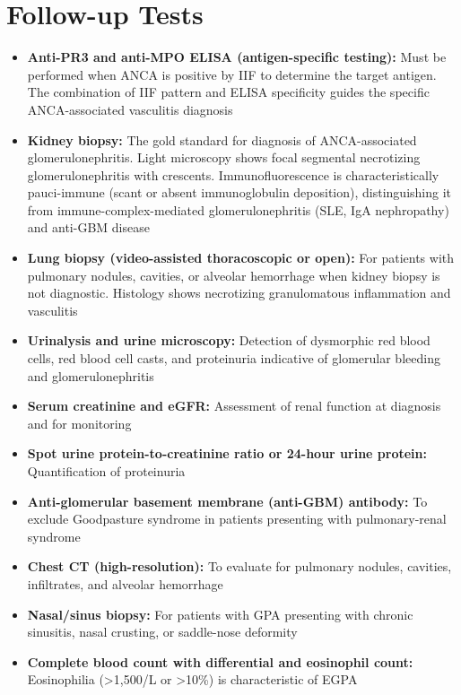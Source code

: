\section*{Follow-up Tests}
\begin{itemize}
  \item \textbf{Anti-PR3 and anti-MPO ELISA (antigen-specific testing):} Must be performed when ANCA is positive by IIF to determine the target antigen. The combination of IIF pattern and ELISA specificity guides the specific ANCA-associated vasculitis diagnosis
  \item \textbf{Kidney biopsy:} The gold standard for diagnosis of ANCA-associated glomerulonephritis. Light microscopy shows focal segmental necrotizing glomerulonephritis with crescents. Immunofluorescence is characteristically pauci-immune (scant or absent immunoglobulin deposition), distinguishing it from immune-complex-mediated glomerulonephritis (SLE, IgA nephropathy) and anti-GBM disease
  \item \textbf{Lung biopsy (video-assisted thoracoscopic or open):} For patients with pulmonary nodules, cavities, or alveolar hemorrhage when kidney biopsy is not diagnostic. Histology shows necrotizing granulomatous inflammation and vasculitis
  \item \textbf{Urinalysis and urine microscopy:} Detection of dysmorphic red blood cells, red blood cell casts, and proteinuria indicative of glomerular bleeding and glomerulonephritis
  \item \textbf{Serum creatinine and eGFR:} Assessment of renal function at diagnosis and for monitoring
  \item \textbf{Spot urine protein-to-creatinine ratio or 24-hour urine protein:} Quantification of proteinuria
  \item \textbf{Anti-glomerular basement membrane (anti-GBM) antibody:} To exclude Goodpasture syndrome in patients presenting with pulmonary-renal syndrome
  \item \textbf{Chest CT (high-resolution):} To evaluate for pulmonary nodules, cavities, infiltrates, and alveolar hemorrhage
  \item \textbf{Nasal/sinus biopsy:} For patients with GPA presenting with chronic sinusitis, nasal crusting, or saddle-nose deformity
  \item \textbf{Complete blood count with differential and eosinophil count:} Eosinophilia (>1,500/\textmu L or >10\%) is characteristic of EGPA
\end{itemize}

